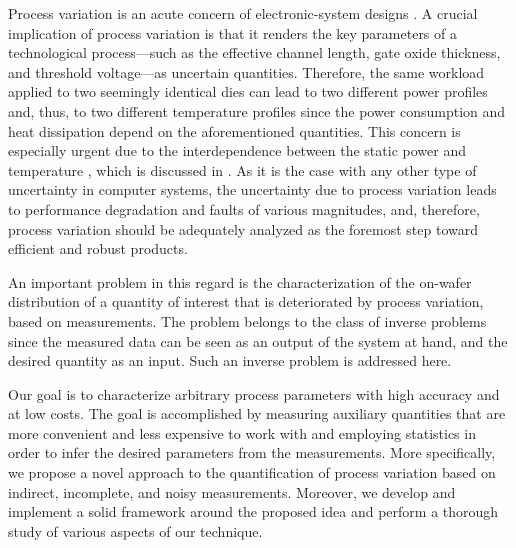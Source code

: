 Process variation is an acute concern of electronic-system designs
\cite{chandrakasan2000, srivastava2010}. A crucial implication of process
variation is that it renders the key parameters of a technological
process---such as the effective channel length, gate oxide thickness, and
threshold voltage---as uncertain quantities. Therefore, the same workload
applied to two seemingly identical dies can lead to two different power profiles
and, thus, to two different temperature profiles since the power consumption and
heat dissipation depend on the aforementioned quantities. This concern is
especially urgent due to the interdependence between the static power and
temperature \cite{liu2007, srivastava2010}, which is discussed in
. As it is the case with any other type of
uncertainty in computer systems, the uncertainty due to process variation leads
to performance degradation and faults of various magnitudes, and, therefore,
process variation should be adequately analyzed as the foremost step toward
efficient and robust products.

An important problem in this regard is the characterization of the on-wafer
distribution of a quantity of interest that is deteriorated by process
variation, based on measurements. The problem belongs to the class of inverse
problems since the measured data can be seen as an output of the system at hand,
and the desired quantity as an input. Such an inverse problem is addressed here.

Our goal is to characterize arbitrary process parameters with high accuracy and
at low costs. The goal is accomplished by measuring auxiliary quantities that
are more convenient and less expensive to work with and employing statistics in
order to infer the desired parameters from the measurements. More specifically,
we propose a novel approach to the quantification of process variation based on
indirect, incomplete, and noisy measurements. Moreover, we develop and implement
a solid framework around the proposed idea and perform a thorough study of
various aspects of our technique.

